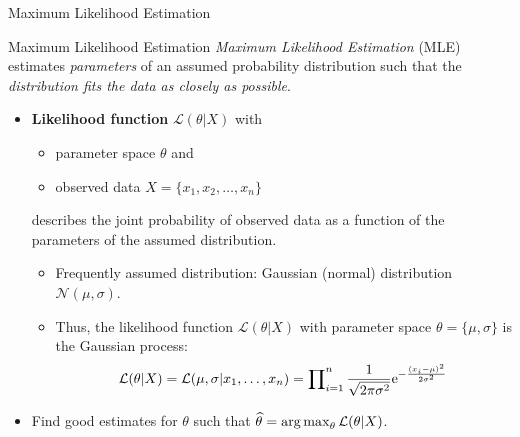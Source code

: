 \begin{frame}{Maximum Likelihood Estimation}
	\begin{block}{Maximum Likelihood Estimation}
		\textit{Maximum Likelihood Estimation} (MLE) estimates \textit{parameters} of an assumed probability distribution such that the \textit{distribution fits the data as closely as possible}.
	\end{block}
	\begin{itemize}
		\item \textbf{Likelihood function} $\mathcal{L}(\theta|X)$ with
		      \begin{itemize}
			      \item parameter space $\theta$ and
			      \item observed data $X=\{x_1, x_2, \dots, x_n\}$
		      \end{itemize}
		      describes the joint probability of observed data as a function of the parameters of the assumed distribution.
		      \begin{itemize}
			      \item Frequently assumed distribution: Gaussian (normal) distribution $\mathcal{N}(\mu, \sigma)$.
			      \item Thus, the likelihood function $\mathcal{L}(\theta|X)$ with parameter space $\theta=\{\mu, \sigma\}$ is the Gaussian process:
			            \begin{equation*}
				            \mathcal{L}(\theta|X)=\mathcal{L}(\mu, \sigma|x_1, \dots, x_n) = \prod\nolimits_{i=1}^n \frac{1}{\sqrt{2\pi \sigma^2}} {\rm e}^{-\frac{(x_i-\mu)^2}{2\sigma^2}}
			            \end{equation*}
		      \end{itemize}
		\item Find good estimates for $\theta$ such that $\widehat{\theta} = \operatorname*{arg\,max}_{\theta} \mathcal{L}(\theta|X)$.
	\end{itemize}
\end{frame}


